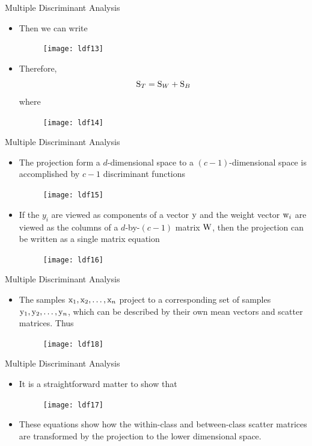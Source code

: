 \begin{frame}{Multiple Discriminant Analysis}
\begin{itemize}
\item Then we can write
\begin{figure}
\texttt{[image: ldf13]}
\end{figure}
\item Therefore,
\begin{equation}
{\rm S}_T={\rm S}_{W}+{\rm S}_{B}\nonumber
\end{equation}
where 
\begin{figure}
\texttt{[image: ldf14]}
\end{figure}
\end{itemize}
\end{frame}



\begin{frame}{Multiple Discriminant Analysis}
\begin{itemize}
\item The projection form a $d$-dimensional space to a $(c-1)$-dimensional space is accomplished by $c-1$ discriminant functions
\begin{figure}
\texttt{[image: ldf15]}
\end{figure}
\item If the $y_i$ are viewed as components of a vector ${\rm y}$ and the weight vector ${\rm w}_i$ are viewed as the columns of a $d$-by-$(c-1)$ matrix ${\rm W}$, then the projection can be written as a single matrix equation
\begin{figure}
\texttt{[image: ldf16]}
\end{figure}
\end{itemize}
\end{frame}

\begin{frame}{Multiple Discriminant Analysis}
\begin{itemize}
\item The samples ${\rm x}_1,{\rm x}_2,\ldots,{\rm x}_n$ project to a corresponding set of samples ${\rm y}_1,{\rm y}_2,\ldots,{\rm y}_n$, which can be described by their own mean vectors and scatter matrices. Thus
\begin{figure}
\texttt{[image: ldf18]}
\end{figure}
\end{itemize}
\end{frame}

\begin{frame}{Multiple Discriminant Analysis}
\begin{itemize}
\item It is a straightforward matter to show that
\begin{figure}
\texttt{[image: ldf17]}
\end{figure}
\item These equations show how the within-class and between-class scatter matrices are transformed by the projection to the lower dimensional space.
\end{itemize}
\end{frame}



